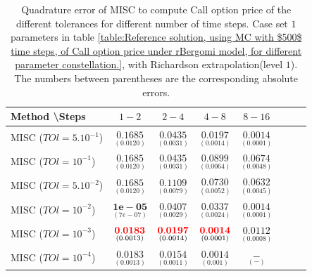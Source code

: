 \documentclass[11pt]{article}
\begin{document}
\begin{table}[!h]
	\centering
	\begin{tabular}{l*{6}{c}r}
		Method \textbackslash  Steps            & $1-2$ & $2-4$ & $4-8$ & $8-16$  \\
		\hline
		MISC ($TOl=5.10^{-1}$)  & $\underset{(  0.0120)}{\mathbf{   0.1685}}$ & $\underset{(0.0031)}{\mathbf{0.0435}}$ & $\underset{(0.0014
			)}{\mathbf{ 0.0197}}$ & $\underset{(0.0001)}{\mathbf{0.0014}}$ \\
		MISC ($TOl=10^{-1}$)  & $\underset{(  0.0120)}{\mathbf{   0.1685}}$ & $\underset{(0.0031)}{\mathbf{0.0435}}$ & $\underset{(0.0064)}{\mathbf{0.0899}}$ & $\underset{(0.0048)}{\mathbf{0.0674}}$  \\
		MISC ($TOl=5.10^{-2}$)  & $\underset{(  0.0120)}{\mathbf{   0.1685}}$ & $\underset{(0.0079)}{\mathbf{0.1109}}$ & $\underset{(0.0052)}{\mathbf{0.0730}}$ & $\underset{(0.0045)}{\mathbf{0.0632}}$  \\
		MISC ($TOl=10^{-2}$)  & $\underset{(7e-07)}{\mathbf{1e-05}}$ &    $\underset{(0.0029)}{\mathbf{0.0407}}$ & $\underset{(0.0024  )}{\mathbf{0.0337}}$ & $\underset{(0.0001)}{\mathbf{0.0014}}$  \\
		MISC ($TOl=10^{-3}$)  & $\underset{(0.0013)}{\mathbf{
				{\color{red}0.0183}}}$ &    $\underset{(0.0014
			)}{\mathbf{{\color{red}0.0197}}}$ & $\underset{(0.0001)}{\mathbf{ {\color{red}0.0014}
		}}$ & $\underset{(0.0008)}{\mathbf{0.0112}}$  \\
		
		MISC ($TOl=10^{-4}$)  & $\underset{(0.0013)}{\mathbf{
				0.0183}}$ &    $\underset{(0.0011
			
			)}{\mathbf{0.0154}}$ & $\underset{(0.001)}{\mathbf{   0.0014
		}}$ & $\underset{(-)}{\mathbf{-}}$  \\
		\hline
	\end{tabular}
	\caption{Quadrature error of MISC to compute Call option price of the different tolerances for different number of time steps. Case set $1$ parameters in table \ref{table:Reference solution, using MC with $500$ time steps, of Call option price under rBergomi model, for different parameter constellation.}, with Richardson extrapolation(level $1$). The numbers between parentheses are the corresponding absolute errors.}
	\label{Quadrature error of MISC to compute Call option price of the different tolerances for different number of time steps. Case set $1$ parameters, with Richardson extrapolation(level $1$). The numbers between parentheses are the corresponding absolute errors.}
\end{table}
\end{document}
